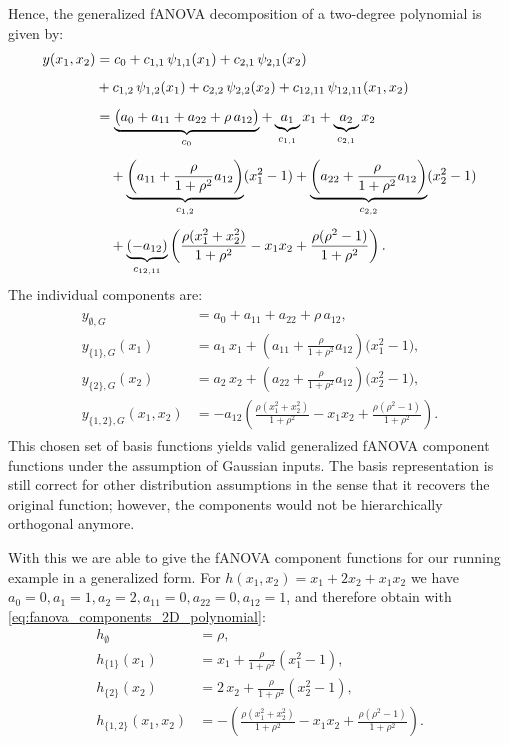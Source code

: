 Hence, the generalized fANOVA decomposition of a two-degree polynomial is given by:
\begin{align*}
y(x_1,x_2) 
&= c_0 
  + c_{1,1}\,\psi_{1,1}(x_1) 
  + c_{2,1}\,\psi_{2,1}(x_2) \\[0.5em]
&+ c_{1,2}\,\psi_{1,2}(x_1)
  + c_{2,2}\,\psi_{2,2}(x_2)
  + c_{12,11}\,\psi_{12,11}(x_1,x_2) \\[0.5em]
&= 
\underbrace{\big(a_0 + a_{11} + a_{22} + \rho\,a_{12}\big)}_{c_0} 
+ \underbrace{a_1}_{c_{1,1}} x_1
+ \underbrace{a_2}_{c_{2,1}} x_2 \\[0.5em]
&\quad 
+ \underbrace{\left(a_{11} + \frac{\rho}{1+\rho^2}a_{12}\right)}_{c_{1,2}} (x_1^2 - 1)
+ \underbrace{\left(a_{22} + \frac{\rho}{1+\rho^2}a_{12}\right)}_{c_{2,2}} (x_2^2 - 1) \notag \\[0.5em]
&\quad 
+ \underbrace{(-a_{12})}_{c_{12, 11}}\left(
    \frac{\rho(x_1^2+x_2^2)}{1+\rho^2} - x_1 x_2 
    + \frac{\rho(\rho^2-1)}{1+\rho^2}
  \right).
\end{align*}
The individual components are:
\begin{align}
\begin{split}
y_{\emptyset, G} &= a_0 + a_{11} + a_{22} + \rho\,a_{12}, \\[0.5em]
y_{\{1\}, G}(x_1) &= a_1\,x_1 
  + \left(a_{11} + \frac{\rho}{1+\rho^2}a_{12}\right)\bigl(x_1^2 - 1\bigr), \\[0.5em]
y_{\{2\}, G}(x_2) &= a_2\,x_2 
  + \left(a_{22} + \frac{\rho}{1+\rho^2}a_{12}\right)\bigl(x_2^2 - 1\bigr), \\[0.5em]
y_{\{1,2\}, G}(x_1,x_2) 
&= -a_{12}\!\left(
    \frac{\rho(x_1^2+x_2^2)}{1+\rho^2} 
    - x_1 x_2 
    + \frac{\rho(\rho^2-1)}{1+\rho^2}
   \right).
\end{split}
\label{eq:fanova_components_2D_polynomial}
\end{align}
This chosen set of basis functions yields valid generalized fANOVA component functions under the assumption of Gaussian inputs. The basis representation is still correct for other distribution assumptions in the sense that it recovers the original function; however, the components would not be hierarchically orthogonal anymore.\par
With this we are able to give the fANOVA component functions for our running example in a generalized form. For $h(x_1,x_2) = x_1 + 2x_2 + x_1 x_2$  we have $a_0 = 0, a_1 = 1, a_2 = 2, a_{11} = 0, a_{22} = 0, a_{12} = 1$, and therefore obtain with \autoref{eq:fanova_components_2D_polynomial}:
\begin{align*}
h_{\emptyset} &= \rho, \\[0.5em]
h_{\{1\}}(x_1) &= x_1 + \frac{\rho}{1+\rho^2}(x_1^2 - 1), \\[0.5em]
h_{\{2\}}(x_2) &= 2\,x_2 + \frac{\rho}{1+\rho^2}(x_2^2 - 1), \\[0.5em]
h_{\{1,2\}}(x_1,x_2) 
&= -\left(\frac{\rho(x_1^2+x_2^2)}{1+\rho^2} - x_1 x_2 + \frac{\rho(\rho^2-1)}{1+\rho^2}\right).
\end{align*}

